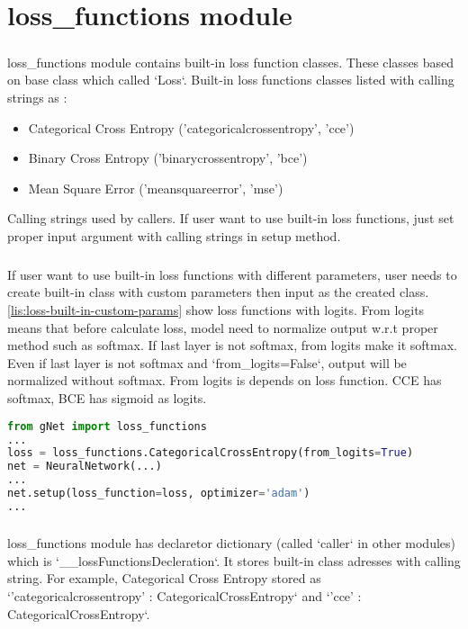 \documentclass[12pt]{report}
\begin{document}
\chapter{loss\_functions module}
\label{ch:loss}

\paragraph{}
loss\_functions module contains built-in loss function classes. These classes based on base class which called `Loss`. Built-in loss functions classes listed with calling strings as : 

\begin{itemize}
	\item Categorical Cross Entropy ('categoricalcrossentropy', 'cce')
	\item Binary Cross Entropy ('binarycrossentropy', 'bce')
	\item Mean Square Error  ('meansquareerror', 'mse')
\end{itemize}

Calling strings used by callers. If user want to use built-in loss functions, just set proper input argument with calling strings in setup method. 

\paragraph{}
If user want to use built-in loss functions with different parameters, user needs to create built-in class with custom parameters then input as the created class. \ref{lis:loss-built-in-custom-params} show loss functions with logits. From logits means that before calculate loss, model need to normalize output w.r.t proper method such as softmax. If last layer is not softmax, from logits make it softmax. Even if last layer is not softmax and `from\_logits=False`, output will be normalized without softmax. From logits is depends on loss function. CCE has softmax, BCE has sigmoid as logits.


\begin{lstlisting}[language=Python, numbers=none, caption={Built-in loss function with custom parameters.}, label={lis:loss-built-in-custom-params}]
from gNet import loss_functions
...
loss = loss_functions.CategoricalCrossEntropy(from_logits=True)
net = NeuralNetwork(...)
...
net.setup(loss_function=loss, optimizer='adam')
...
\end{lstlisting}

\paragraph{}
loss\_functions module has declaretor dictionary (called `caller` in other modules) which is `\_\_lossFunctionsDecleration`. It stores built-in class adresses with calling string. For example, Categorical Cross Entropy stored as `'categoricalcrossentropy' : CategoricalCrossEntropy` and `'cce' : CategoricalCrossEntropy`.
\end{document}
